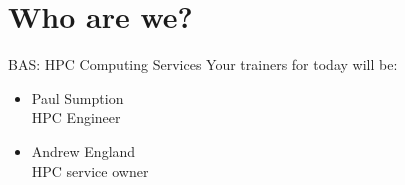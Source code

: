 \documentclass[handout]{beamer} %
\begin{document}
{
\section{Who are we?}
%
\begin{frame}{BAS: HPC Computing Services}
Your trainers for today will be:\\
\begin{itemize}
\item{\alert{Paul Sumption}\\{}\qquad\qquad HPC Engineer}
\item{\alert{Andrew England}\\{}\qquad\qquad HPC service owner}
\end{itemize}
\end{frame}
}
\end{document}

